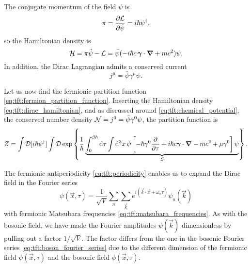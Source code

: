 The conjugate momentum of the field $\psi$ is
\begin{equation}
	\pi = \pdv{\mathcal{L}}{\dot{\psi}} = i \hbar \psi^\dagger ,
\end{equation}
so the Hamiltonian density is
\begin{equation}
	\mathcal{H} = \pi \dot\psi - \mathcal{L} = \bar\psi ( -i \hbar c \, {\bm{\gamma}} \cdot {\bm{\nabla}} + m c^2 ) \psi .
\label{eq:tft:dirac_hamiltonian}
\end{equation}
In addition, the Dirac Lagrangian admits a conserved current 
\begin{equation}
	j^\mu = \bar\psi \gamma^\mu \psi .
\label{eq:tft:dirac_conserved_current}
\end{equation}

Let us now find the fermionic partition function \eqref{eq:tft:fermion_partition_function}.
Inserting the Hamiltonian density \eqref{eq:tft:dirac_hamiltonian}, and as discussed around \cref{eq:tft:chemical_potential}, the conserved number density $\mathcal{N} = j^0 = \bar\psi \gamma^0 \psi$, the partition function is
\begin{equation}
	Z = \int \mathcal{D} [i \hbar \psi^\dagger] \int \mathcal{D} 
	    \exp \left\{ \frac{1}{\hbar} \underbrace{\int_0^{\beta \hbar} \mathop{}\!\mathrm{d} \tau \int \mathop{}\!\mathrm{d}^3 x \, \bar\psi \left[ -\hbar \gamma^0 \pdv{}{\tau} + i \hbar c {\bm{\gamma}} \cdot {\bm{\nabla}} - mc^2 + \mu \gamma^0 \right] \psi}_{S} \right\} .
\label{eq:tft:dirac_partition_function_first}
\end{equation}

The fermionic antiperiodicity \eqref{eq:tft:periodicity} enables us to expand the Dirac field in the Fourier series
\begin{equation}
	\psi(\vec{x}, \tau) = \frac{1}{\sqrt{V}} \sum_n \sum_\vec{k} e^{i (\vec{k} \cdot \vec{x} + \omega_n \tau)} \psi_{n}(\vec{k})
\label{eq:tft:dirac_fourier_series}
\end{equation}
with fermionic Matsubara frequencies \eqref{eq:tft:matsubara_frequencies}.
As with the bosonic field, we have made the Fourier amplitudes $\psi(\vec{k})$ dimensionless by pulling out a factor $1/\sqrt{V}$.
The factor differs from the one in the bosonic Fourier series \eqref{eq:tft:boson_fourier_series} due to the different dimension of the fermionic field $\psi(\vec{x}, \tau)$ and the bosonic field $\phi(\vec{x}, \tau)$.

